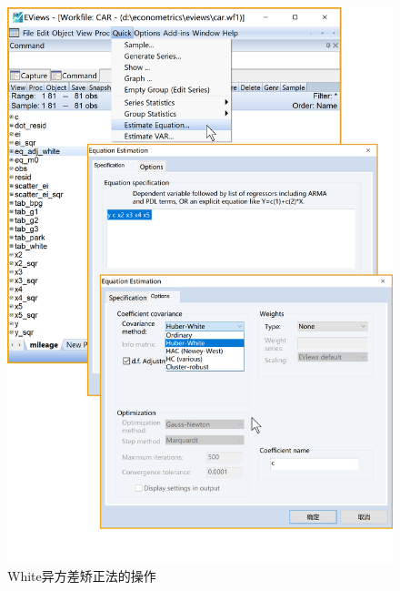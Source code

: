 \documentclass[12pt,(landscape,a4paper),(portrait,a4paper)]{article}
\begin{document}
\begin{figure}

{\centering \includegraphics[width=24.92in]{picture/lab6-heteroskedasticity/5-adj-white1} 

}

\caption{White异方差矫正法的操作}\label{fig:fig-adj-white}
\end{figure}
\end{document}
